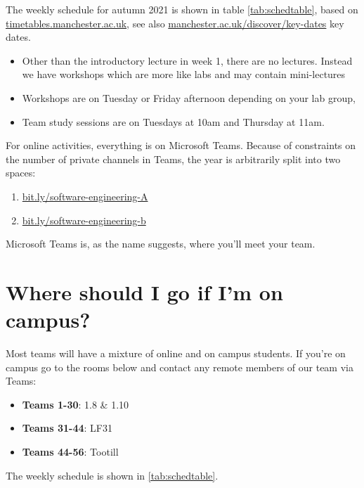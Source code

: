 \documentclass[
]{book}
\providecommand{\tightlist}{%
  \setlength{\itemsep}{0pt}\setlength{\parskip}{0pt}}
\begin{document}
The weekly schedule for autumn 2021 is shown in table \ref{tab:schedtable}, based on \href{https://timetables.manchester.ac.uk/}{timetables.manchester.ac.uk}, see also \href{https://www.manchester.ac.uk/discover/key-dates/}{manchester.ac.uk/discover/key-dates} key dates.

\begin{itemize}
\tightlist
\item
  Other than the introductory lecture in week 1, there are no lectures. Instead we have workshops which are more like labs and may contain mini-lectures
\item
  Workshops are on Tuesday or Friday afternoon depending on your lab group,
\item
  Team study sessions are on Tuesdays at 10am and Thursday at 11am.
\end{itemize}

For online activities, everything is on Microsoft Teams. Because of constraints on the number of private channels in Teams, the year is arbitrarily split into two spaces:

\begin{enumerate}
\def\labelenumi{\arabic{enumi}.}
\tightlist
\item
  \href{https://bit.ly/software-engineering-A}{bit.ly/software-engineering-A}
\item
  \href{https://bit.ly/software-engineering-b}{bit.ly/software-engineering-b}
\end{enumerate}

Microsoft Teams is, as the name suggests, where you'll meet your team.

\hypertarget{campus}{%
\section{Where should I go if I'm on campus?}\label{campus}}

Most teams will have a mixture of online and on campus students. If you're on campus go to the rooms below and contact any remote members of our team via Teams:

\begin{itemize}
\tightlist
\item
  \textbf{Teams 1-30}: 1.8 \& 1.10
\item
  \textbf{Teams 31-44}: LF31
\item
  \textbf{Teams 44-56}: Tootill
\end{itemize}

The weekly schedule is shown in \ref{tab:schedtable}.
\end{document}
